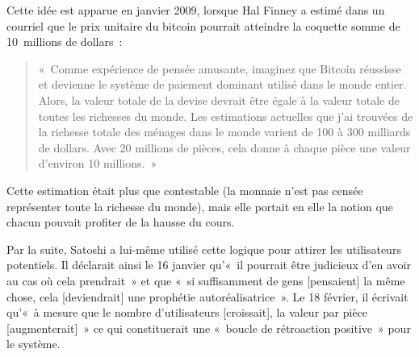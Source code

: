 Cette idée est apparue en janvier 2009, lorsque Hal Finney a estimé dans un courriel que le prix unitaire du bitcoin pourrait atteindre la coquette somme de 10~millions de dollars~: 

\begin{quote}
«~Comme expérience de pensée amusante, imaginez que Bitcoin réussisse et devienne le système de paiement dominant utilisé dans le monde entier. Alors, la valeur totale de la devise devrait être égale à la valeur totale de toutes les richesses du monde. Les estimations actuelles que j'ai trouvées de la richesse totale des ménages dans le monde varient de 100 à 300 milliards de dollars. Avec 20 millions de pièces, cela donne à chaque pièce une valeur d'environ 10 millions.~»
\end{quote}

Cette estimation était plus que contestable (la monnaie n'est pas censée représenter toute la richesse du monde), mais elle portait en elle la notion que chacun pouvait profiter de la hausse du cours.

Par la suite, Satoshi a lui-même utilisé cette logique pour attirer les utilisateurs potentiels. Il déclarait ainsi le 16 janvier qu'«~il pourrait être judicieux d'en avoir au cas où cela prendrait~» et que «~si suffisamment de gens [pensaient] la même chose, cela [deviendrait] une prophétie autoréalisatrice~». Le 18 février, il écrivait qu'«~à mesure que le nombre d'utilisateurs [croissait], la valeur par pièce [augmenterait]~» ce qui constituerait une «~boucle de rétroaction positive~» pour le système.

